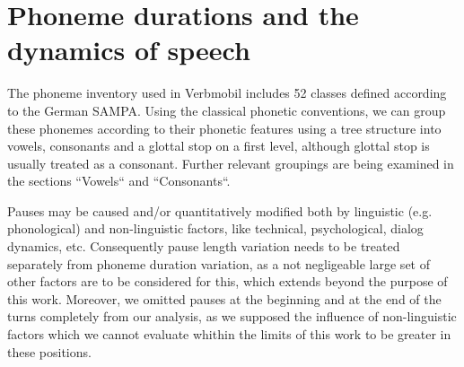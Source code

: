 \documentclass[a4paper]{scrreprt}
\begin{document}
\chapter{Phoneme durations and the dynamics of speech}
The phoneme inventory used in Verbmobil includes 52 classes defined according to the German SAMPA. Using the classical phonetic conventions, we can group these phonemes according to their phonetic features using a tree structure into vowels, consonants and a glottal stop on a first level, although glottal stop is usually treated as a consonant. Further relevant groupings are being examined in the sections ``Vowels`` and ``Consonants``.

Pauses may be caused and/or quantitatively modified both by linguistic (e.g. phonological) and non-linguistic factors, like technical, psychological, dialog dynamics, etc. Consequently pause length variation needs to be treated separately from phoneme duration variation, as a not negligeable large set of other factors are to be considered for this, which extends beyond the purpose of this work. Moreover, we omitted pauses at the beginning and at the end of the turns completely from our analysis, as we supposed the influence of non-linguistic factors which we cannot evaluate whithin the limits of this work to be greater in these positions.
\end{document}
